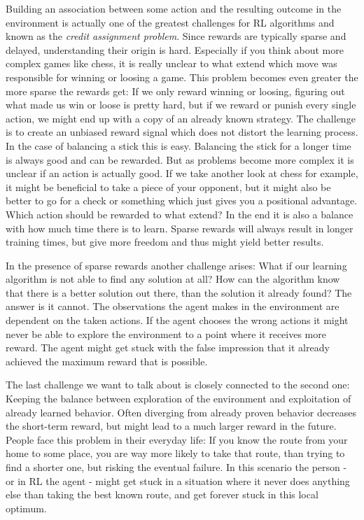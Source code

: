 Building an association between some action and the resulting outcome in the environment is actually one of the greatest challenges for RL algorithms and known as the \textit{credit assignment problem}. Since rewards are typically sparse and delayed, understanding their origin is hard. Especially if you think about more complex games like chess, it is really unclear to what extend which move was responsible for winning or loosing a game. This problem becomes even greater the more sparse the rewards get: If we only reward winning or loosing, figuring out what made us win or loose is pretty hard, but if we reward or punish every single action, we might end up with a copy of an already known strategy. The challenge is to create an unbiased reward signal which does not distort the learning process. In the case of balancing a stick this is easy. Balancing the stick for a longer time is always good and can be rewarded. But as problems become more complex it is unclear if an action is actually good. If we take another look at chess for example, it might be beneficial to take a piece of your opponent, but it might also be better to go for a check or something which just gives you a positional advantage. Which action should be rewarded to what extend? In the end it is also a balance with how much time there is to learn. Sparse rewards will always result in longer training times, but give more freedom and thus might yield better results.

In the presence of sparse rewards another challenge arises: What if our learning algorithm is not able to find any solution at all? How can the algorithm know that there is a better solution out there, than the solution it already found? The answer is it cannot. The observations the agent makes in the environment are dependent on the taken actions. If the agent chooses the wrong actions it might never be able to explore the environment to a point where it receives more reward. The agent might get stuck with the false impression that it already achieved the maximum reward that is possible.

The last challenge we want to talk about is closely connected to the second one: Keeping the balance between exploration of the environment and exploitation of already learned behavior. Often diverging from already proven behavior decreases the short-term reward, but might lead to a much larger reward in the future. People face this problem in their everyday life: If you know the route from your home to some place, you are way more likely to take that route, than trying to find a shorter one, but risking the eventual failure. In this scenario the person - or in RL the agent - might get stuck in a situation where it never does anything else than taking the best known route, and get forever stuck in this local optimum.


